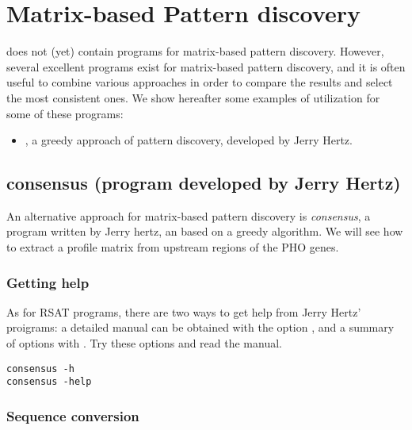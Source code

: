 \chapter{Matrix-based Pattern discovery}

\RSAT does not (yet) contain programs for matrix-based pattern
discovery. However, several excellent programs exist for matrix-based
pattern discovery, and it is often useful to combine various
approaches in order to compare the results and select the most
consistent ones. We show hereafter some examples of utilization for
some of these programs:

\begin{itemize}

\item {}, a greedy approach of pattern discovery,
  developed by Jerry Hertz.

\end{itemize}

\section{consensus (program developed by Jerry Hertz)}

An alternative approach for matrix-based pattern discovery is
\textit{consensus}, a program written by Jerry hertz, an based on a
greedy algorithm. We will see how to extract a profile matrix from
upstream regions of the PHO genes.

\subsection{Getting help}

As for RSAT programs, there are two ways to get help from Jerry Hertz'
proigrams: a detailed manual can be obtained with the option
, and a summary of options with . Try these
options and read the manual.

{\color{Blue} \begin{footnotesize} 
\begin{verbatim}
consensus -h
consensus -help
\end{verbatim} \end{footnotesize}
}


\subsection{Sequence conversion}


